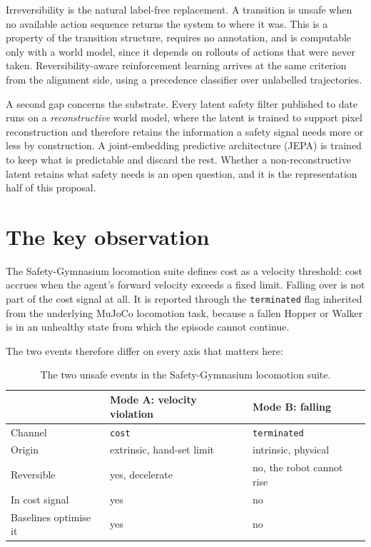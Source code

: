 \documentclass[11pt,a4paper]{article}
\begin{document}
Irreversibility is the natural label-free replacement. A transition is unsafe when no
available action sequence returns the system to where it was. This is a property of the
transition structure, requires no annotation, and is computable only with a world model,
since it depends on rollouts of actions that were never taken. Reversibility-aware
reinforcement learning \parencite{grinsztajn2021turning} arrives at the same criterion from
the alignment side, using a precedence classifier over unlabelled trajectories.

A second gap concerns the substrate. Every latent safety filter published to date runs on a
\emph{reconstructive} world model, where the latent is trained to support pixel
reconstruction and therefore retains the information a safety signal needs more or less by
construction. A joint-embedding predictive architecture (JEPA) is trained to keep what is
predictable and discard the rest. Whether a non-reconstructive latent retains what safety
needs is an open question, and it is the representation half of this proposal.

\section{The key observation}
\label{sec:observation}

The Safety-Gymnasium locomotion suite \parencite{ji2023safety} defines cost as a velocity
threshold: cost accrues when the agent's forward velocity exceeds a fixed limit. Falling
over is not part of the cost signal at all. It is reported through the \texttt{terminated}
flag inherited from the underlying MuJoCo locomotion task, because a fallen Hopper or Walker
is in an unhealthy state from which the episode cannot continue.

The two events therefore differ on every axis that matters here:

\begin{table}[h]
\centering
\begin{tabular}{lll}
\toprule
 & \textbf{Mode A: velocity violation} & \textbf{Mode B: falling} \\
\midrule
Channel        & \texttt{cost}                & \texttt{terminated} \\
Origin         & extrinsic, hand-set limit    & intrinsic, physical \\
Reversible     & yes, decelerate              & no, the robot cannot rise \\
In cost signal & yes                          & no \\
Baselines optimise it & yes                   & no \\
\bottomrule
\end{tabular}
\caption{The two unsafe events in the Safety-Gymnasium locomotion suite.}
\end{table}
\end{document}
